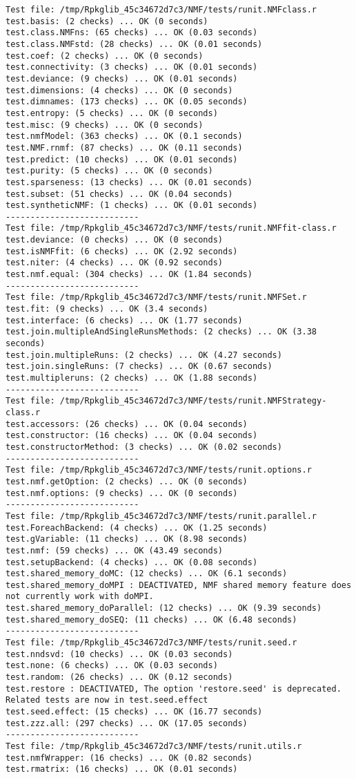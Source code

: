\documentclass[10pt]{article}\usepackage[]{graphicx}\usepackage[]{color}
\begin{document}
\begin{verbatim}
Test file: /tmp/Rpkglib_45c34672d7c3/NMF/tests/runit.NMFclass.r 
test.basis: (2 checks) ... OK (0 seconds)
test.class.NMFns: (65 checks) ... OK (0.03 seconds)
test.class.NMFstd: (28 checks) ... OK (0.01 seconds)
test.coef: (2 checks) ... OK (0 seconds)
test.connectivity: (3 checks) ... OK (0.01 seconds)
test.deviance: (9 checks) ... OK (0.01 seconds)
test.dimensions: (4 checks) ... OK (0 seconds)
test.dimnames: (173 checks) ... OK (0.05 seconds)
test.entropy: (5 checks) ... OK (0 seconds)
test.misc: (9 checks) ... OK (0 seconds)
test.nmfModel: (363 checks) ... OK (0.1 seconds)
test.NMF.rnmf: (87 checks) ... OK (0.11 seconds)
test.predict: (10 checks) ... OK (0.01 seconds)
test.purity: (5 checks) ... OK (0 seconds)
test.sparseness: (13 checks) ... OK (0.01 seconds)
test.subset: (51 checks) ... OK (0.04 seconds)
test.syntheticNMF: (1 checks) ... OK (0.01 seconds)
--------------------------- 
Test file: /tmp/Rpkglib_45c34672d7c3/NMF/tests/runit.NMFfit-class.r 
test.deviance: (0 checks) ... OK (0 seconds)
test.isNMFfit: (6 checks) ... OK (2.92 seconds)
test.niter: (4 checks) ... OK (0.92 seconds)
test.nmf.equal: (304 checks) ... OK (1.84 seconds)
--------------------------- 
Test file: /tmp/Rpkglib_45c34672d7c3/NMF/tests/runit.NMFSet.r 
test.fit: (9 checks) ... OK (3.4 seconds)
test.interface: (6 checks) ... OK (1.77 seconds)
test.join.multipleAndSingleRunsMethods: (2 checks) ... OK (3.38 seconds)
test.join.multipleRuns: (2 checks) ... OK (4.27 seconds)
test.join.singleRuns: (7 checks) ... OK (0.67 seconds)
test.multipleruns: (2 checks) ... OK (1.88 seconds)
--------------------------- 
Test file: /tmp/Rpkglib_45c34672d7c3/NMF/tests/runit.NMFStrategy-class.r 
test.accessors: (26 checks) ... OK (0.04 seconds)
test.constructor: (16 checks) ... OK (0.04 seconds)
test.constructorMethod: (3 checks) ... OK (0.02 seconds)
--------------------------- 
Test file: /tmp/Rpkglib_45c34672d7c3/NMF/tests/runit.options.r 
test.nmf.getOption: (2 checks) ... OK (0 seconds)
test.nmf.options: (9 checks) ... OK (0 seconds)
--------------------------- 
Test file: /tmp/Rpkglib_45c34672d7c3/NMF/tests/runit.parallel.r 
test.ForeachBackend: (4 checks) ... OK (1.25 seconds)
test.gVariable: (11 checks) ... OK (8.98 seconds)
test.nmf: (59 checks) ... OK (43.49 seconds)
test.setupBackend: (4 checks) ... OK (0.08 seconds)
test.shared_memory_doMC: (12 checks) ... OK (6.1 seconds)
test.shared_memory_doMPI : DEACTIVATED, NMF shared memory feature does not currently work with doMPI.
test.shared_memory_doParallel: (12 checks) ... OK (9.39 seconds)
test.shared_memory_doSEQ: (11 checks) ... OK (6.48 seconds)
--------------------------- 
Test file: /tmp/Rpkglib_45c34672d7c3/NMF/tests/runit.seed.r 
test.nndsvd: (10 checks) ... OK (0.03 seconds)
test.none: (6 checks) ... OK (0.03 seconds)
test.random: (26 checks) ... OK (0.12 seconds)
test.restore : DEACTIVATED, The option 'restore.seed' is deprecated. Related tests are now in test.seed.effect
test.seed.effect: (15 checks) ... OK (16.77 seconds)
test.zzz.all: (297 checks) ... OK (17.05 seconds)
--------------------------- 
Test file: /tmp/Rpkglib_45c34672d7c3/NMF/tests/runit.utils.r 
test.nmfWrapper: (16 checks) ... OK (0.82 seconds)
test.rmatrix: (16 checks) ... OK (0.01 seconds)


\end{verbatim}
\end{document}
